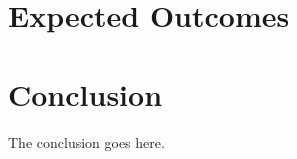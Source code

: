 \documentclass[journal,oneside,a4paper,onecolumn]{IEEEtran}
\begin{document}
\section{Expected Outcomes}

\section{Conclusion}
The conclusion goes here.




\end{document}
